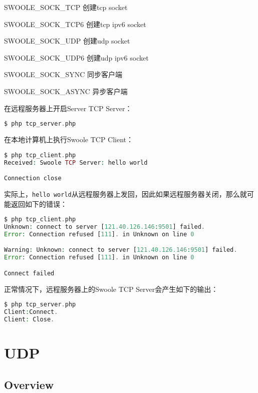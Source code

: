 \begin{compactitem}
\item SWOOLE\_SOCK\_TCP 创建tcp socket
\item SWOOLE\_SOCK\_TCP6 创建tcp ipv6 socket
\item SWOOLE\_SOCK\_UDP 创建udp socket
\item SWOOLE\_SOCK\_UDP6 创建udp ipv6 socket
\item SWOOLE\_SOCK\_SYNC 同步客户端
\item SWOOLE\_SOCK\_ASYNC 异步客户端
\end{compactitem}



在远程服务器上开启Server TCP Server：

\begin{lstlisting}[language=PHP]
$ php tcp_server.php
\end{lstlisting}

在本地计算机上执行Swoole TCP Client：

\begin{lstlisting}[language=PHP]
$ php tcp_client.php
Received: Swoole TCP Server: hello world

Connection close
\end{lstlisting}

实际上，\texttt{hello world}从远程服务器上发回，因此如果远程服务器关闭，那么就可能返回如下的错误：

\begin{lstlisting}[language=PHP]
$ php tcp_client.php
Unknown: connect to server [121.40.126.146:9501] failed. 
Error: Connection refused [111]. in Unknown on line 0

Warning: Unknown: connect to server [121.40.126.146:9501] failed. 
Error: Connection refused [111]. in Unknown on line 0

Connect failed
\end{lstlisting}

正常情况下，远程服务器上的Swoole TCP Server会产生如下的输出：


\begin{lstlisting}[language=PHP]
$ php tcp_server.php 
Client:Connect.
Client: Close.
\end{lstlisting}


\chapter{UDP}


\section{Overview}

